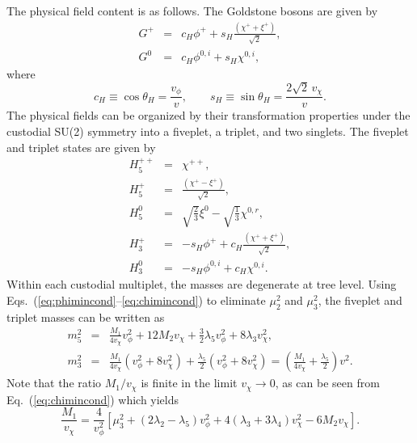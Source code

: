 \documentclass[11pt]{article}
\begin{document}
The physical field content is as follows.  The Goldstone bosons are given by
\begin{eqnarray}
	G^+ &=& c_H \phi^+ + s_H \frac{\left(\chi^++\xi^+\right)}{\sqrt{2}}, \nonumber\\
	G^0  &=& c_H \phi^{0,i} + s_H \chi^{0,i},
\end{eqnarray}
where
\begin{equation}
	c_H \equiv \cos\theta_H = \frac{v_{\phi}}{v}, \qquad
	s_H \equiv \sin\theta_H = \frac{2\sqrt{2}\,v_\chi}{v}.
\end{equation}
The physical fields can be organized by their transformation properties under the custodial SU(2) symmetry into a fiveplet, a triplet, and two singlets.  The fiveplet and triplet states are given by
\begin{eqnarray}
	H_5^{++}  &=&  \chi^{++}, \nonumber\\
	H_5^+ &=& \frac{\left(\chi^+ - \xi^+\right)}{\sqrt{2}}, \nonumber\\
	H_5^0 &=& \sqrt{\frac{2}{3}} \xi^0 - \sqrt{\frac{1}{3}} \chi^{0,r}, \nonumber\\
	H_3^+ &=& - s_H \phi^+ + c_H \frac{\left(\chi^++\xi^+\right)}{\sqrt{2}}, \nonumber\\
	H_3^0 &=& - s_H \phi^{0,i} + c_H \chi^{0,i}.
\end{eqnarray}
Within each custodial multiplet, the masses are degenerate at tree level.  Using Eqs.~(\ref{eq:phimincond}--\ref{eq:chimincond}) to eliminate $\mu_2^2$ and $\mu_3^2$, the fiveplet and triplet masses can be written as
\begin{eqnarray}
	m_5^2 &=& \frac{M_1}{4 v_{\chi}} v_\phi^2 + 12 M_2 v_{\chi} 
	+ \frac{3}{2} \lambda_5 v_{\phi}^2 + 8 \lambda_3 v_{\chi}^2, \nonumber \\
	m_3^2 &=&  \frac{M_1}{4 v_{\chi}} (v_\phi^2 + 8 v_{\chi}^2) 
	+ \frac{\lambda_5}{2} (v_{\phi}^2 + 8 v_{\chi}^2) 
	= \left(  \frac{M_1}{4 v_{\chi}} + \frac{\lambda_5}{2} \right) v^2.
\end{eqnarray}
Note that the ratio $M_1/v_{\chi}$ is finite in the limit $v_{\chi} \to 0$, as can be seen from Eq.~(\ref{eq:chimincond}) which yields
\begin{equation}
	\frac{M_1}{v_{\chi}} = \frac{4}{v_{\phi}^2} 
	\left[ \mu_3^2 + (2 \lambda_2 - \lambda_5) v_{\phi}^2 
	+ 4(\lambda_3 + 3 \lambda_4) v_{\chi}^2 - 6 M_2 v_{\chi} \right].
\end{equation}
\end{document}
